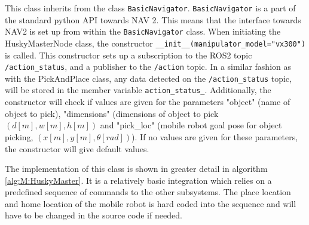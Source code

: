 

%


This class inherits from the class \lstinline{BasicNavigator}. \lstinline{BasicNavigator} is a part of the standard python API towards NAV 2. This means that the interface towards NAV2 is set up from within the \lstinline{BasicNavigator} class. When initiating the HuskyMasterNode class, the constructor \lstinline{__init__(manipulator_model="vx300")} is called. This constructor sets up a subscription to the ROS2 topic \lstinline{/action_status}, and a publisher to the \lstinline{/action} topic. In a similar fashion as with the PickAndPlace class, any data detected on the \lstinline{/action_status} topic, will be stored in the member variable \lstinline{action_status_}. Additionally, the constructor will check if values are given for the parameters "object" (name of object to pick), "dimensions" (dimensions of object to pick $(d[m], w[m], h[m])$ and "pick\_loc" (mobile robot goal pose for object picking, $(x[m], y[m], \theta[rad])$). If no values are given for these parameters, the constructor will give default values. 

The implementation of this class is shown in greater detail in algorithm \ref{alg:M:HuskyMaster}. It is a relatively basic integration which relies on a predefined sequence of commands to the other subsystems. The place location and home location of the mobile robot is hard coded into the sequence and will have to be changed in the source code if needed.

